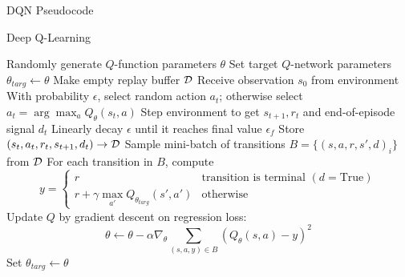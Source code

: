 \documentclass[9pt]{beamer}
\begin{document}
\begin{frame}{DQN Pseudocode}

\begin{algorithm}[H]
\small
   \caption{Deep Q-Learning}
   \label{alg1}
\begin{algorithmic}
     \STATE Randomly generate $Q$-function parameters $\theta$
     \STATE Set target $Q$-network parameters $\theta_{targ} \leftarrow \theta$
     \STATE Make empty replay buffer ${\mathcal D}$
	 \STATE Receive observation $s_0$ from environment
	 \STATE With probability $\epsilon$, select random action $a_t$; otherwise select $a_t = \arg \max_{a} Q_{\theta}(s_t, a)$
	 \STATE Step environment to get $s_{t+1}, r_t$ and end-of-episode signal $d_t$
	 \STATE Linearly decay $\epsilon$ until it reaches final value $\epsilon_f$
	 \STATE Store $(s_t, a_t, r_t, s_{t+1}, d_t) \to {\mathcal D}$
	 \STATE Sample mini-batch of transitions $B = \{(s,a,r,s',d)_i\}$ from ${\mathcal D}$
	 \STATE For each transition in $B$, compute 
	 \begin{equation*}
	 y = \left\{ \begin{array}{ll}
	 r & \text{transition is terminal }(d=\text{True}) \\
	 r + \gamma \max_{a'} Q_{\theta_{targ}}(s', a') & \text{otherwise}
	 \end{array}\right.
	 \end{equation*}
	 \STATE Update $Q$ by gradient descent on regression loss:
	 \begin{equation*}
	 \theta \leftarrow \theta - \alpha \nabla_{\theta} \sum_{(s,a,y)\in B} \left(Q_{\theta}(s,a) - y \right)^2
	 \end{equation*}
	 	\STATE Set $\theta_{targ} \leftarrow \theta$
	 \ENDIF

	\ENDFOR
\end{algorithmic}
\end{algorithm}

\end{frame}
\end{document}
